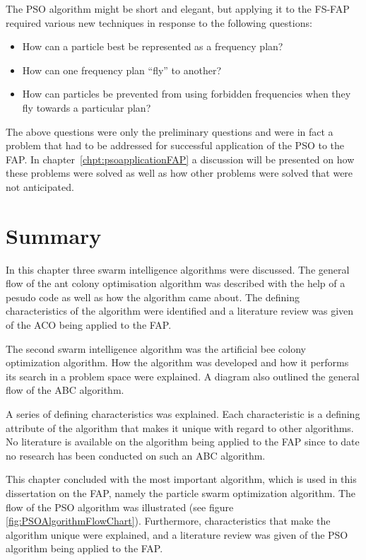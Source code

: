 The PSO algorithm might be short and elegant, but applying it to the FS-FAP required various new techniques in response to the following questions:
\begin{itemize}
\item How can a particle best be represented as a frequency plan?
\item How can one frequency plan ``fly'' to another?
\item How can particles be prevented from using forbidden frequencies when they fly towards a particular plan?
\end{itemize}

The above questions were only the preliminary questions and were in fact a problem that had to be addressed for successful application of the PSO to the FAP. In chapter~\ref{chpt:psoapplicationFAP} a discussion will be presented on how these problems were solved as well as how other problems were solved that were not anticipated.

\section{Summary}
In this chapter three swarm intelligence algorithms were discussed. The general flow of the ant colony optimisation algorithm was described with the help of a pesudo code as well as how the algorithm came about. The defining characteristics of the algorithm were identified and a literature review was given of the ACO being applied to the FAP.

The second swarm intelligence algorithm was the artificial bee colony optimization algorithm. How the algorithm was developed and how it performs its search in a problem space were explained. A diagram also outlined the general flow of the ABC algorithm.

A series of defining characteristics was explained. Each characteristic is a defining attribute of the algorithm that makes it unique with regard to other algorithms. No literature is available on the algorithm being applied to the FAP since to date no research has been conducted on such an ABC algorithm.

This chapter concluded with the most important algorithm, which is used in this dissertation on the FAP, namely the particle swarm optimization algorithm. The flow of the PSO algorithm was illustrated (see figure \ref{fig:PSOAlgorithmFlowChart}). Furthermore, characteristics that make the algorithm unique were explained, and a literature review was given of the PSO algorithm being applied to the FAP.

